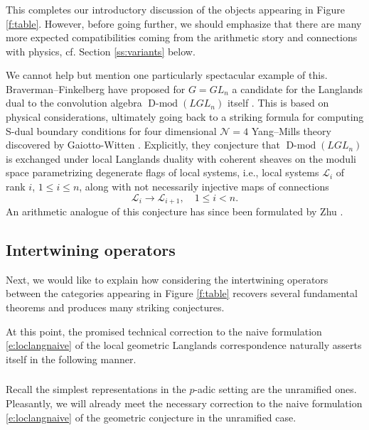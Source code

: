 \documentclass[10pt]{amsart}
\newcommand{\on}{\operatorname}
\newcommand{\Dmod}{\on{D-mod}}
\theoremstyle{remark}
\newcommand{\sL}{\mathscr{L}}
\numberwithin{equation}{section}
\begin{document}
\subsubsection{} This completes our introductory discussion of the objects appearing in Figure \ref{f:table}. However, before going further, we should emphasize that there are many more expected compatibilities coming from the arithmetic story and connections with physics, cf. Section \ref{ss:variants} below. 

We cannot help but mention one particularly spectacular example of this. Braverman--Finkelberg have proposed for $G = GL_n$ a candidate for the Langlands dual to the convolution algebra $\Dmod(LGL_n)$ itself \cite{bravermanfinkelbergconjecturecoloumb}.  This is based on physical considerations, ultimately going back to a striking formula for computing S-dual boundary conditions for four dimensional $\mathscr{N}=4$ Yang--Mills theory discovered by Gaiotto-Witten \cite{gaiottowitten}. Explicitly, they conjecture that $\Dmod(LGL_n)$ is exchanged under local Langlands duality with coherent sheaves on the moduli space parametrizing degenerate flags of local systems, i.e., local systems $\sL_i$ of rank $i$, $1 \leqslant i \leqslant n$, along with not necessarily injective maps of connections $$\sL_i \rightarrow \sL_{i+1}, \quad 1 \leqslant i < n.$$An arithmetic analogue of this conjecture has since been formulated by Zhu \cite{zhufamilies}.






\subsection{Intertwining operators}

Next, we would like to explain how considering the intertwining operators 
between the categories appearing in Figure \ref{f:table} recovers several 
fundamental theorems and produces many striking conjectures. 

At this point, the promised technical correction to the naive formulation 
\eqref{e:loclangnaive} of the local geometric Langlands correspondence 
naturally asserts itself in the following manner.

\subsubsection{} Recall the simplest representations in the $p$-adic 
setting are the unramified ones. Pleasantly, we will already meet the necessary correction to the 
naive formulation \eqref{e:loclangnaive} of the geometric conjecture in the unramified case. 
\end{document}
